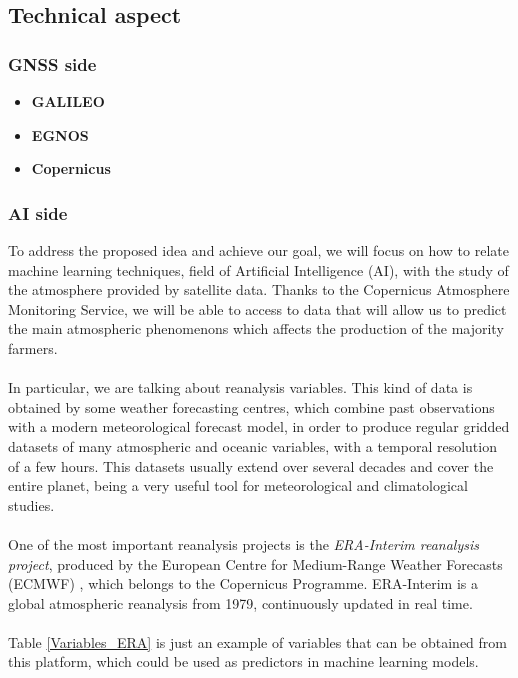 
\newpage
\subsection{Technical aspect}
\subsubsection{GNSS side}
\begin{itemize}
    \item \textbf{GALILEO}
    \item \textbf{EGNOS}
    \item \textbf{Copernicus}
\end{itemize}
\subsubsection{AI side}
To address the proposed idea and achieve our goal, we will focus on how to relate machine learning techniques, field of Artificial Intelligence (AI), with the study of the atmosphere provided by satellite data. Thanks to the Copernicus Atmosphere Monitoring Service, we will be able to access to data that will allow us to predict the main atmospheric phenomenons which affects the production of the majority farmers.\\\\
%
In particular, we are talking about reanalysis variables. This kind of data is obtained by some weather forecasting centres, which combine past observations with a modern meteorological forecast model, in order to produce regular gridded datasets of many atmospheric and oceanic variables, with a temporal resolution of a few hours. This datasets usually extend over several decades and cover the entire planet, being a very useful tool for meteorological and climatological studies.\\\\
%
One of the most important reanalysis projects is the {\em ERA-Interim reanalysis project}, produced by the European Centre for Medium-Range Weather Forecasts (ECMWF) \cite{ERA_Interim}, which belongs to the Copernicus Programme. ERA-Interim is a global atmospheric reanalysis from 1979, continuously updated in real time.\\\\
%
Table \ref{Variables_ERA} is just an example of variables that can be obtained from this platform, which could be used as predictors in machine learning models.

